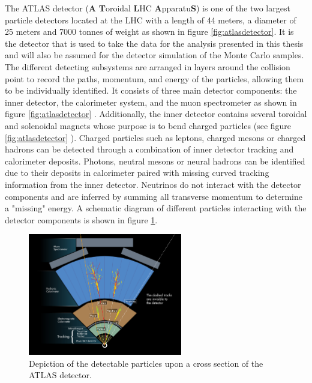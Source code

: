 The ATLAS detector (\textbf{A} \textbf{T}oroidal \textbf{L}HC \textbf{A}pparatu\textbf{S}) is one of the two largest particle detectors located at the LHC with a length of 44 meters, a diameter of 25 meters and 7000 tonnes of weight as shown in figure \ref{fig:atlasdetector}. It is the detector that is used to take the data for the analysis presented in this thesis and will also be assumed for the detector simulation of the Monte Carlo samples. The different detecting subsystems are arranged in layers around the collision point to record the paths, momentum, and energy of the particles, allowing them to be individually identified. It consists of three main detector components: the inner detector, the calorimeter system, and the muon spectrometer as shown in figure \ref{fig:atlasdetector} . Additionally, the inner detector contains several toroidal and solenoidal magnets whose purpose is to bend charged particles (see figure \ref{fig:atlasdetector} ). Charged particles such as leptons, charged mesons or charged hadrons can be detected through a combination of inner detector tracking and calorimeter deposits. Photons, neutral mesons or neural hadrons can be identified due to their deposits in calorimeter paired with missing curved tracking information from the inner detector. Neutrinos do not interact with the detector components and are inferred by summing all transverse momentum to determine a "missing" energy. A schematic diagram of different particles interacting with the detector components is shown in figure \ref{fig:particleinteraction}. 

\begin{figure}[!h]
\centering
\includegraphics[width=0.6\textwidth]{ubonn-thesis/Chapters/Chapters_03/Figure/Particle_interaction.jpg}
\caption{ Depiction of the detectable particles upon a cross section of the ATLAS detector. \cite{PequenaoB}}
\label{fig:particleinteraction}
\end{figure}


